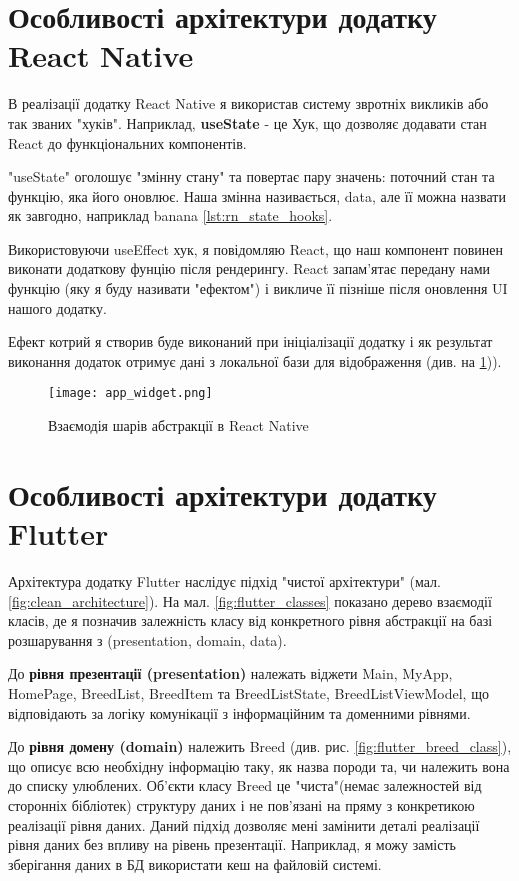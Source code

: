\section{Особливості архітектури додатку React Native}
\label{sec:kn_app_architecture}
В реалізації додатку React Native я використав систему звротніх викликів або так званих "хуків".
Наприклад, \textbf{useState} - це Хук, що дозволяє додавати стан React до функціональних компонентів.

"useState" оголошує "змінну стану" та повертає пару значень: поточний стан та функцію, яка його оновлює.
Наша змінна називається, data, але її можна назвати як завгодно, наприклад banana \ref{lst:rn_state_hooks}.

Використовуючи useEffect хук, я повідомляю React, що наш компонент повинен виконати додаткову фунцію після рендерингу.
React запам'ятає передану нами функцію (яку я буду називати "ефектом") і викличе її пізніше після оновлення UI нашого додатку.

Ефект котрий я створив буде виконаний при ініціалізації додатку
і як результат виконання додаток отримує дані з локальної бази для відображення (див. на \ref{fig:rn_realm})).

\begin{figure}
    \begin{center}
        \texttt{[image: app\_widget.png]}
        \caption{Взаємодія шарів абстракції в React Native}
        \label{fig:rn_realm}
    \end{center}
\end{figure}


\section{Особливості архітектури додатку Flutter}
\label{sec:flutter_network_app}

Архітектура додатку Flutter наслідує підхід "чистої архітектури" (мал. \ref{fig:clean_architecture}).
На мал. \ref{fig:flutter_classes} показано дерево взаємодії класів, де я позначив залежність класу
від конкретного рівня абстракції на базі розшарування з (presentation, domain, data).

До \textbf{рівня презентації (presentation)} належать віджети Main, MyApp, HomePage, BreedList, BreedItem та
BreedListState, BreedListViewModel, що відповідають за логіку комунікації з інформаційним та доменними рівнями.

До \textbf{рівня домену (domain)} належить Breed (див. рис. \ref{fig:flutter_breed_class}), що описує всю необхідну інформацію таку, як назва породи та, чи
належить вона до списку улюблених. Об'єкти класу Breed це "чиста"(немає залежностей від сторонніх бібліотек) структуру даних і не пов'язані на пряму
з конкретикою реалізації рівня даних. Даний підхід дозволяє мені замінити деталі реалізації рівня даних без впливу на
рівень презентації. Наприклад, я можу замість зберігання даних в БД використати кеш на файловій системі.

